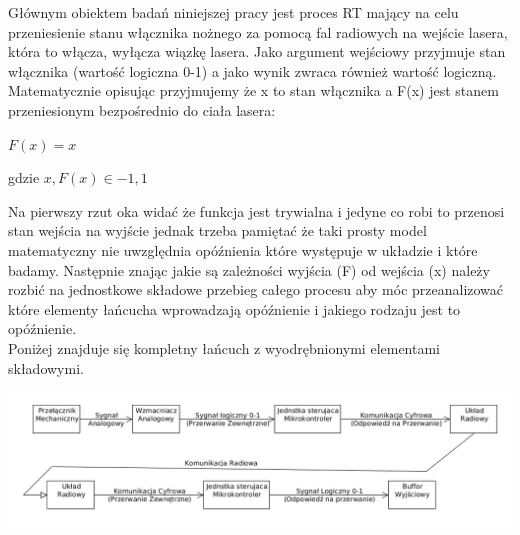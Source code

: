 \tab Głównym obiektem badań niniejszej pracy jest proces RT mający na celu przeniesienie stanu włącznika nożnego za pomocą fal radiowych na wejście lasera, która to włącza, wyłącza wiązkę lasera.
Jako argument wejściowy przyjmuje stan włącznika (wartość logiczna 0-1) a jako wynik zwraca również wartość logiczną. 
Matematycznie opisując przyjmujemy że x to stan włącznika a F(x) jest stanem przeniesionym bezpośrednio do ciała lasera: \\

\centerline{ $ F(x) = x  $ }

\centerline{  gdzie $  x, F(x) \in {-1,1} $ }

Na pierwszy rzut oka widać że funkcja jest trywialna i jedyne co robi to przenosi stan wejścia na wyjście jednak trzeba pamiętać że taki prosty model matematyczny nie uwzględnia opóźnienia które występuje w układzie i które badamy.
Następnie znając jakie są zależności wyjścia (F) od wejścia (x) należy rozbić na jednostkowe składowe przebieg całego procesu aby móc przeanalizować które elementy łańcucha wprowadzają opóźnienie i jakiego rodzaju jest to opóźnienie. \\
Poniżej znajduje się kompletny łańcuch z wyodrębnionymi elementami składowymi.\\

   \centerline{\includegraphics[scale=0.50]{./img/target_system/Lancuch_RT.png}} 

